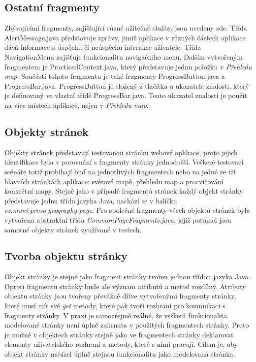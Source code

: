\documentclass[
    color,   %
	table,   %
    twoside, %
]{fithesis3}
\begin{document}
\subsection*{Ostatní fragmenty}
Zbývajícími fragmenty, zajišťující různé užitečné služby, jsou uvedeny zde. Třída AlertMessage.java představuje zprávy, jimiž aplikace v různých částech aplikace dává informace o úspěchu či neúspěchu interakce uživatele. Třída NavigationMenu zajišťuje funkcionalitu navigačního menu. Dalším vytvořeným fragmentem je PracticedContext.java, který představuje jednu položku v \emph{Přehledu map}. Součástí tohoto fragmentu je také fragmenty ProgressButton.java a ProgressBar.java. ProgressButton je složený z tlačítka a ukazatele znalosti, který je definovaný ve vlastní třídě ProgressBar.java. Tento ukazatel znalosti je použit na více místech aplikace, nejen v \emph{Přehledu map}.

\subsection{Objekty stránek}
Objekty stránek představují testovanou stránku webové aplikace, proto jejich identifikace byla v porovnání s fragmenty stránky jednodušší. Veškeré testovací scénáře totiž probíhají buď na jednotlivých fragmentech nebo na jedné ze tří hlavních stránkách aplikace: světové mapě, přehledu map a procvičování konkrétní mapy. Stejně jako v případě fragmentů stránek každý objekt stránky představuje jednu třídu jazyka Java, nachází se v balíčku \emph{cz.muni.proso.geography.page}. Pro společné fragmenty všech objektů stránek byla vytvořena abstraktní třída \emph{CommonPageFragments.java}, jejíž potomci jsou samotné objekty stránek využívané v testech.

\subsection*{Tvorba objektu stránky}

Objekt stránky je stejně jako fragment stránky tvořen jednou třídou jazyka Java. Oproti fragmentu stránky bude ale význam atributů a metod rozdílný. Atributy objektu stránky jsou tvořeny převážně dříve vytvořenými fragmenty stránky, které musí mít své \emph{get} metody, které pak tvoří rozhraní pro komunikaci s fragmenty stránky. V praxi je samozřejmě reálné, že veškerá funkcionalita modelované stránky není úplně zahrnuta v použitých fragmentech stránky. Proto je možné v objektech stránky stejně jako ve fragmentech stránky deklarovat elementy uživatelského rozhraní a metody, které s nimi pracují. Cílem je, aby objekt stránky nabízel úplně stejnou funkcionalitu jako modelovaná stránka.
\end{document}
